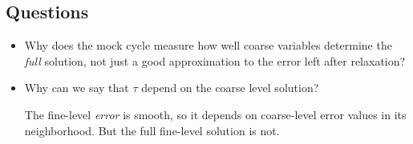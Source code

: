 \documentclass{article}
\begin{document}
\subsection{Questions}
\begin{itemize}
\item Why does the mock cycle measure how well coarse variables determine the \emph{full} solution, not just a good approximation to the error left after relaxation?
\item Why can we say that $\tau$ depend on the coarse level solution? 

The fine-level \emph{error} is smooth, so it depends on coarse-level error values in its neighborhood. But the full fine-level solution is not.
\end{itemize}



\end{document}
